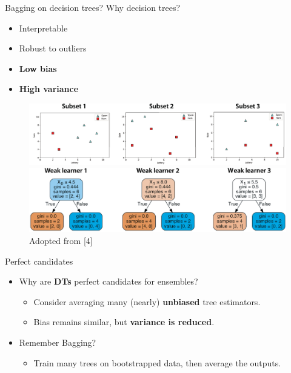 \documentclass[serif, aspectratio=169]{beamer}
\begin{document}
\begin{frame}{Bagging on decision trees?}
    Why decision trees?
    \begin{itemize}
        \itemsep0.25em
        \justifying
        \item Interpretable
        \item Robust to outliers
        \item \textbf{Low bias}
        \item \textbf{High variance}
    \end{itemize}
    \endminipage
    \hfill
    \begin{figure}[!htb]
        \includegraphics[width=\linewidth]{pic/dt_plot.png} \\ \medskip
        \includegraphics[width=\linewidth]{pic/dt_tree.png}
        {\scriptsize Adopted from [4]}
    \end{figure}
    \endminipage
\end{frame}

\begin{frame}{Perfect candidates}
    \begin{itemize}
        \itemsep1em
        \justifying
        \item Why are \textbf{DTs} perfect candidates for ensembles?
        \begin{itemize}
            \itemsep0.25em
            \item Consider averaging many (nearly) \textbf{unbiased} tree estimators.
            \item Bias remains similar, but \textbf{variance is reduced}.
        \end{itemize}
        \item Remember Bagging?
        \begin{itemize}
            \item Train many trees on bootstrapped data, then average the outputs.
        \end{itemize}
    \end{itemize}
\end{frame}
\end{document}
